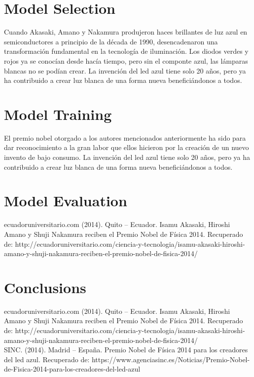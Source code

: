 \documentclass{article}
\begin{document}
\section{Model Selection}
Cuando Akasaki, Amano y Nakamura produjeron haces brillantes de luz azul en semiconductores a principio de la década de 1990, desencadenaron una transformación fundamental en la tecnología de iluminación. Los diodos verdes y rojos ya se conocían desde hacía tiempo, pero sin el componte azul, las lámparas blancas no se podían crear. La invención del led azul tiene solo 20 años, pero ya ha contribuido a crear luz blanca de una forma nueva beneficiándonos a todos.

\section{Model Training}
El premio nobel otorgado a los autores mencionados anteriormente ha sido para dar reconocimiento a la gran labor que ellos hicieron por la creación de un nuevo invento de bajo consumo. La invención del led azul tiene solo 20 años, pero ya ha contribuido a crear luz blanca de una forma nueva beneficiándonos a todos.



\section{Model Evaluation}
ecuadoruniversitario.com  (2014). Quito – Ecuador. Isamu Akasaki, Hiroshi Amano y Shuji Nakamura reciben el Premio Nobel de Física 2014.  Recuperado de: http://ecuadoruniversitario.com/ciencia-y-tecnologia/isamu-akasaki-hiroshi-amano-y-shuji-nakamura-reciben-el-premio-nobel-de-fisica-2014/\\

\section{Conclusions}
ecuadoruniversitario.com  (2014). Quito – Ecuador. Isamu Akasaki, Hiroshi Amano y Shuji Nakamura reciben el Premio Nobel de Física 2014.  Recuperado de: http://ecuadoruniversitario.com/ciencia-y-tecnologia/isamu-akasaki-hiroshi-amano-y-shuji-nakamura-reciben-el-premio-nobel-de-fisica-2014/\\

SINC. (2014). Madrid – España. Premio Nobel de Física 2014 para los creadores del led azul. Recuperado de: https://www.agenciasinc.es/Noticias/Premio-Nobel-de-Fisica-2014-para-los-creadores-del-led-azul 
\end{document}
